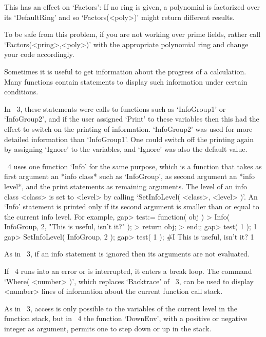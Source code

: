 This has an effect on `Factors': If no ring is given, a polynomial is
factorized over its `DefaultRing' and so `Factors(<poly>)'
might return different results.

To be safe from this problem, if you are not working over prime fields,
rather call `Factors(<pring>,<poly>)' with the appropriate polynomial ring
and change your code accordingly.


Sometimes it is useful to get information about the progress of a
calculation.
Many {\GAP} functions contain statements to display such information
under certain conditions.

In {\GAP}~3, these statements were calls to functions such as
`InfoGroup1' or `InfoGroup2', and if the user assigned `Print' to
these variables then this had the effect to switch on the printing of
information.
`InfoGroup2' was used for more detailed information than `InfoGroup1'.
One could switch off the printing again by assigning `Ignore' to the
variables, and `Ignore' was also the default value.

{\GAP}~4 uses one function `Info' for the same purpose,
which is a function that takes as first argument an *info class* such as
`InfoGroup', as second argument an *info level*, and the print statements
as remaining arguments.
The level of an info class <class> is set to <level> by calling
`SetInfoLevel( <class>, <level> )'.
An `Info' statement is printed only if its second argument is smaller than
or equal to the current info level.
For example,
\beginexample
gap> test:= function( obj )
> Info( InfoGroup, 2, "This is useful, isn't it?" );
> return obj;
> end;;
gap> test( 1 );
1
gap> SetInfoLevel( InfoGroup, 2 );
gap> test( 1 );
#I  This is useful, isn't it?
1
\endexample

As in {\GAP}~3, if an info statement is ignored then its arguments are
not evaluated.



If {\GAP}~4 runs into an error or is interrupted,
it enters a break loop.
The command `Where( <number> )', which replaces `Backtrace' of {\GAP}~3,
can be used to display <number> lines of information about the current
function call stack.

As in {\GAP}~3, access is only possible to the variables of the current
level in the function stack,
but in {\GAP}~4 the function `DownEnv', with a positive or negative
integer as argument, permits one to step down or up in the
stack.

